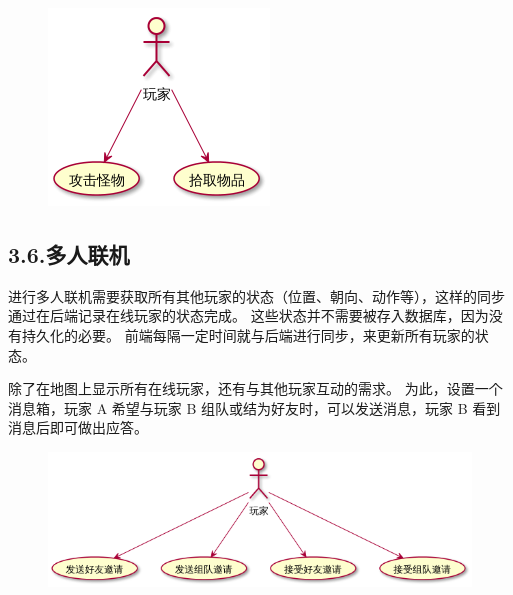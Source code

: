 \documentclass{article}
\begin{document}
\begin{figure}[tbp]%
\begin{mdcenter}%

\noindent{}\includegraphics[keepaspectratio=true,width=\dimwidth{0.30}]{./img/5}{}%

\mdhr{}%

\noindent{}%
\end{mdcenter}%
\end{figure}%

\subsection{3.6.\hspace*{0.5em}多人联机}\label{36}%

\noindent{}进行多人联机需要获取所有其他玩家的状态（位置、朝向、动作等），这样的同步通过在后端记录在线玩家的状态完成。 这些状态并不需要被存入数据库，因为没有持久化的必要。 前端每隔一定时间就与后端进行同步，来更新所有玩家的状态。%

除了在地图上显示所有在线玩家，还有与其他玩家互动的需求。 为此，设置一个消息箱，玩家 A 希望与玩家 B 组队或结为好友时，可以发送消息，玩家 B 看到消息后即可做出应答。%

\begin{figure}[tbp]%
\begin{mdcenter}%

\noindent{}\includegraphics[keepaspectratio=true,width=\dimwidth{0.90}]{./img/6}{}%

\mdhr{}%

\noindent{}%
\end{mdcenter}%
\end{figure}%
\end{document}
